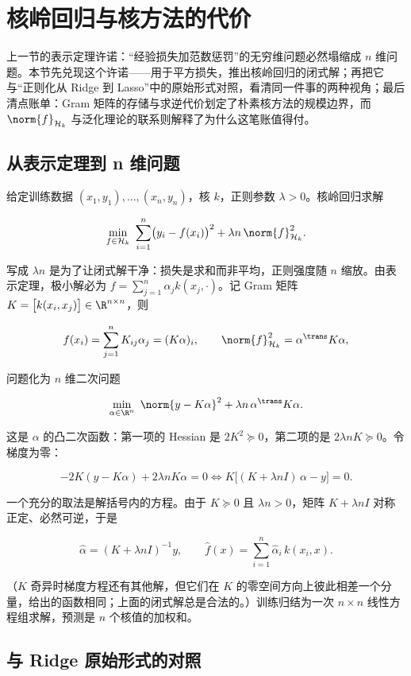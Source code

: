 \section{核岭回归与核方法的代价}

上一节的表示定理许诺：``经验损失加范数惩罚''的无穷维问题必然塌缩成 \(n\) 维问题。本节先兑现这个许诺——用于平方损失，推出核岭回归的闭式解；再把它与``正则化从 Ridge 到 Lasso''中的原始形式对照，看清同一件事的两种视角；最后清点账单：Gram 矩阵的存储与求逆代价划定了朴素核方法的规模边界，而 \(\norm{f}_{\mathcal{H}_k}\) 与泛化理论的联系则解释了为什么这笔账值得付。

\subsection{从表示定理到 n 维问题}

给定训练数据 \((x_1,y_1),\dots,(x_n,y_n)\)，核 \(k\)，正则参数 \(\lambda>0\)。核岭回归求解

\[
\min_{f\in\mathcal{H}_k}\ 
\sum_{i=1}^{n}\bigl(y_i-f(x_i)\bigr)^{2}
+\lambda n\,\norm{f}_{\mathcal{H}_k}^{2}.
\]

写成 \(\lambda n\) 是为了让闭式解干净：损失是求和而非平均，正则强度随 \(n\) 缩放。由表示定理，极小解必为 \(f=\sum_{j=1}^{n}\alpha_j k(x_j,\cdot)\)。记 Gram 矩阵 \(K=\bigl[k(x_i,x_j)\bigr]\in\R^{n\times n}\)，则

\[
f(x_i)=\sum_{j=1}^{n}K_{ij}\alpha_j=(K\alpha)_i,
\qquad
\norm{f}_{\mathcal{H}_k}^{2}=\alpha^{\trans}K\alpha,
\]

问题化为 \(n\) 维二次问题

\[
\min_{\alpha\in\R^{n}}\ 
\norm{y-K\alpha}^{2}+\lambda n\,\alpha^{\trans}K\alpha.
\]

这是 \(\alpha\) 的凸二次函数：第一项的 Hessian 是 \(2K^{2}\succeq0\)，第二项的是 \(2\lambda nK\succeq0\)。令梯度为零：

\[
-2K(y-K\alpha)+2\lambda nK\alpha=0
\iff
K\bigl[(K+\lambda nI)\,\alpha-y\bigr]=0.
\]

一个充分的取法是解括号内的方程。由于 \(K\succeq0\) 且 \(\lambda n>0\)，矩阵 \(K+\lambda nI\) 对称正定、必然可逆，于是

\[
\widehat\alpha=(K+\lambda nI)^{-1}y,
\qquad
\widehat f(x)=\sum_{i=1}^{n}\widehat\alpha_i\,k(x_i,x).
\]

（\(K\) 奇异时梯度方程还有其他解，但它们在 \(K\) 的零空间方向上彼此相差一个分量，给出的函数相同；上面的闭式解总是合法的。）训练归结为一次 \(n\times n\) 线性方程组求解，预测是 \(n\) 个核值的加权和。

\subsection{与 Ridge 原始形式的对照}

